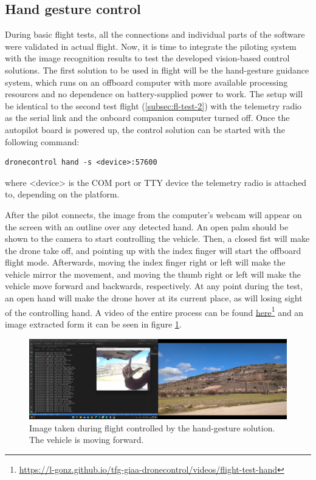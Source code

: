 \subsection{Hand gesture control}
\label{subsec:fl-test-4}


During basic flight tests, all the connections and individual parts of the software were validated in actual flight.
Now, it is time to integrate the piloting system with the image recognition results to test the developed vision-based control solutions.
The first solution to be used in flight will be the hand-gesture guidance system, which runs on an offboard computer with more available processing resources and no dependence on battery-supplied power to work.
The setup will be identical to the second test flight (\ref{subsec:fl-test-2}) with the telemetry radio as the serial link and the onboard companion computer turned off.
Once the autopilot board is powered up, the control solution can be started with the following command:
\begin{verbatim}
dronecontrol hand -s <device>:57600
\end{verbatim}
where <device> is the COM port or TTY device the telemetry radio is attached to, depending on the platform.


After the pilot connects, the image from the computer's webcam will appear on the screen with an outline over any detected hand.
An open palm should be shown to the camera to start controlling the vehicle.
Then, a closed fist will make the drone take off, and pointing up with the index finger will start the offboard flight mode.
Afterwards, moving the index finger right or left will make the vehicle mirror the movement, 
and moving the thumb right or left will make the vehicle move forward and backwards, respectively.
At any point during the test, an open hand will make the drone hover at its current place, as will losing sight of the controlling hand.
A video of the entire process can be found \href{https://l-gonz.github.io/tfg-giaa-dronecontrol/videos/flight-test-hand}{here}\footnote{\url{https://l-gonz.github.io/tfg-giaa-dronecontrol/videos/flight-test-hand}} and an image extracted form it can be seen in figure \ref{fig:flight-test-hand}.

\begin{figure}
  \centering
  \includegraphics[width=\textwidth, keepaspectratio]{img/video-field-test-hand.png}
  \caption{Image taken during flight controlled by the hand-gesture solution. The vehicle is moving forward.}
  \label{fig:flight-test-hand}
\end{figure}

